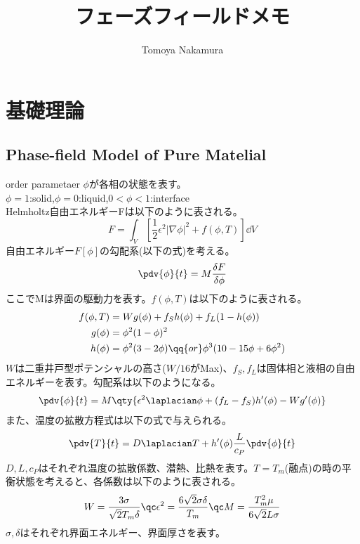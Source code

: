 \documentclass[twocolumn,landscape]{ltjsarticle}
\author{Tomoya Nakamura}
\begin{document}
\title{フェーズフィールドメモ}
\maketitle

\section{基礎理論}
\subsection{Phase-field Model of Pure Matelial}
order parametaer $\phi$が各相の状態を表す。\\
$\phi=1$:solid,$\phi=0$:liquid,$0<\phi<1$:interface\\
Helmholtz自由エネルギーFは以下のように表される。
\begin{equation}
  F=\int_V\left[\frac{1}{2}\epsilon^2|\nabla\phi|^2+f(\phi,T)\right]\dd{V}
\end{equation}
自由エネルギー$F[\phi]$の勾配系(以下の式)を考える。
\begin{equation}
  \pdv{\phi}{t}=M\frac{\delta F}{\delta \phi}
\end{equation}
ここでMは界面の駆動力を表す。$f(\phi,T)$は以下のように表される。
\begin{equation}
  \begin{split}
    f(\phi,T)&=W g(\phi)+f_S h(\phi)+f_L(1-h(\phi))\\
    g(\phi)&=\phi^2(1-\phi)^2\\
    h(\phi)&=\phi^2(3-2\phi)\qq{or}\phi^3(10-15\phi+6\phi^2)
  \end{split}
\end{equation}
$W$は二重井戸型ポテンシャルの高さ($W/16$がMax)、$f_S,f_L$は固体相と液相の自由エネルギーを表す。勾配系は以下のようになる。
\begin{equation}
  \begin{split}
    \pdv{\phi}{t}&=M\qty{\epsilon^2\laplacian\phi+(f_L-f_S)h'(\phi)-Wg'(\phi)}\\
  \end{split}
\end{equation}
また、温度の拡散方程式は以下の式で与えられる。
\begin{equation}
  \pdv{T}{t}=D\laplacian T+h'(\phi)\frac{L}{c_P}\pdv{\phi}{t}
\end{equation}
$D,L,c_P$はそれぞれ温度の拡散係数、潜熱、比熱を表す。$T=T_m$(融点)の時の平衡状態を考えると、各係数は以下のように表される。
\begin{equation}
  W=\frac{3\sigma}{\sqrt{2}T_m\delta}\qc \epsilon^2=\frac{6\sqrt{2}\sigma\delta}{T_m}\qc M=\frac{T_m^2\mu}{6\sqrt{2}L\sigma}
\end{equation}
$\sigma,\delta$はそれぞれ界面エネルギー、界面厚さを表す。
\end{document}
